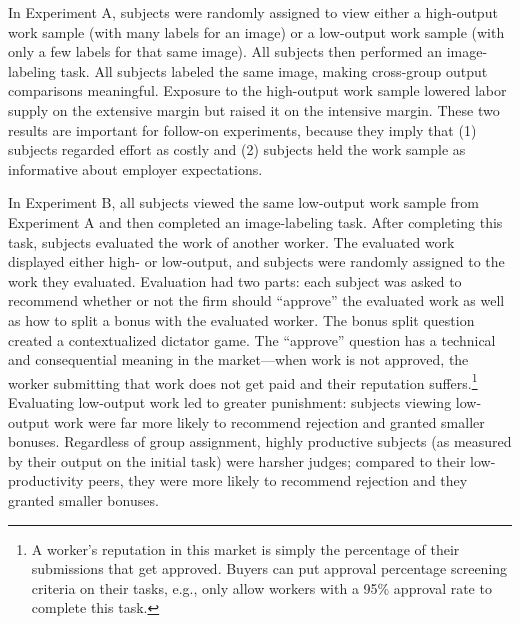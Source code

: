 \documentclass[12pt]{article}
\begin{document}
In Experiment A, subjects were randomly assigned to view either a
high-output work sample (with many labels for an image) or a
low-output work sample (with only a few labels for that same image).
All subjects then performed an image-labeling task. All subjects
labeled the same image, making cross-group output comparisons
meaningful. Exposure to the high-output work sample lowered labor
supply on the extensive margin but raised it on the intensive
margin. These two results are important for follow-on experiments,
because they imply that (1) subjects regarded effort as costly and (2)
subjects held the work sample as informative about employer
expectations.

In Experiment B, all subjects viewed the same low-output work sample
from Experiment A and then completed an image-labeling task.  After
completing this task, subjects evaluated the work of another
worker. The evaluated work displayed either high- or low-output, and
subjects were randomly assigned to the work they evaluated. Evaluation
had two parts: each subject was asked to recommend whether or not the
firm should ``approve'' the evaluated work as well as how to split a
bonus with the evaluated worker. The bonus split question created a
contextualized dictator game. The ``approve'' question has a technical
and consequential meaning in the market---when work is not approved,
the worker submitting that work does not get paid and their reputation
suffers.\footnote{A worker's reputation in this market is simply the
  percentage of their submissions that get approved. Buyers can put
  approval percentage screening criteria on their tasks, e.g., only
  allow workers with a 95\% approval rate to complete this task.}
Evaluating low-output work led to greater punishment: subjects viewing
low-output work were far more likely to recommend rejection and
granted smaller bonuses. Regardless of group assignment, highly
productive subjects (as measured by their output on the initial task)
were harsher judges; compared to their low-productivity peers, they
were more likely to recommend rejection and they granted smaller
bonuses.
\end{document}

